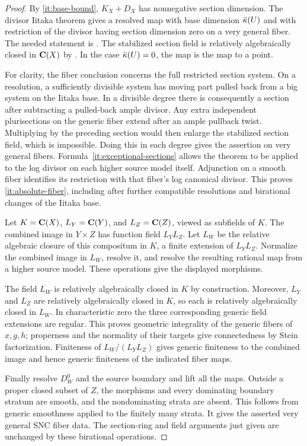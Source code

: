 \begin{proof}
By \eqref{it:base-bound}, $K_X+D_X$ has nonnegative section dimension.
The divisor Iitaka theorem gives a resolved map with base dimension
$\bar\kappa(U)$ and with restriction of the divisor having section dimension
zero on a very general fiber.  The needed statement is
\cite[Theorem~3, p.~357, and its proof in \S4, pp.~361--363]{IitakaOriginal}.
The stabilized section field is relatively algebraically closed in
$\mathbf C(X)$ by \cite[\S3, Proposition~1, p.~359]{IitakaOriginal}.  In the case
$\bar\kappa(U)=0$, the map is the map to a point.

For clarity, the fiber conclusion concerns the full restricted section
system.  On a resolution, a sufficiently divisible system has moving part
pulled back from a big system on the Iitaka base.  In a divisible degree
there is consequently a section after subtracting a pulled-back ample
divisor.  Any extra independent plurisections on the generic fiber extend
after an ample pullback twist.  Multiplying by the preceding section
would then enlarge the stabilized section field, which is impossible.
Doing this in each degree gives the assertion on very general fibers.
Formula~\eqref{it:exceptional-sections} allows the theorem to be applied
to the log divisor on each higher source model itself.  Adjunction on a
smooth fiber identifies its restriction with that fiber's log canonical
divisor.  This proves \eqref{it:absolute-fiber}, including after further
compatible resolutions and birational changes of the Iitaka base.

Let $K=\mathbf C(X)$, $L_Y=\mathbf C(Y)$, and $L_Z=\mathbf C(Z)$, viewed as subfields of $K$.
The combined image in $Y\times Z$ has function field $L_YL_Z$.  Let $L_W$
be the relative algebraic closure of this compositum in $K$, a finite
extension of $L_YL_Z$.  Normalize the combined image in $L_W$, resolve it,
and resolve the resulting rational map from a higher source model.
These operations give the displayed morphisms.

The field $L_W$ is relatively algebraically closed in $K$ by construction.
Moreover, $L_Y$ and $L_Z$ are relatively algebraically closed in $K$, so
each is relatively algebraically closed in $L_W$.  In characteristic zero
the three corresponding generic field extensions are regular.  This
proves geometric integrality of the generic fibers of $x,g,h$; properness
and the normality of their targets give connectedness by Stein
factorization.  Finiteness of $L_W/(L_YL_Z)$ gives generic finiteness to
the combined image and hence generic finiteness of the indicated fiber
maps.

Finally resolve $D_W^0$ and the source boundary and lift all the maps.
Outside a proper closed subset of $Z$, the morphisms and every dominating
boundary stratum are smooth, and the nondominating strata are absent.
This follows from generic smoothness applied to the finitely many strata.
It gives the asserted very general SNC fiber data.  The section-ring and
field arguments just given are unchanged by these birational operations.
\end{proof}

